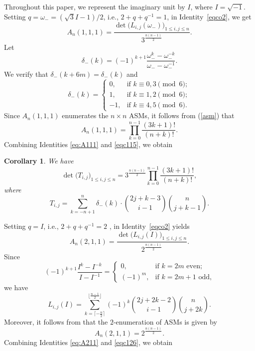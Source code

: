 \documentclass[12pt, a4paper]{amsart} %
\numberwithin{equation}{section}
\newtheorem{corollary}[theorem]{Corollary}
\begin{document}
\medskip

Throughout this paper, we represent the imaginary unit by $I$, where $I=\sqrt{-1}$.
Setting $q=\omega_{-}=({\sqrt{3}I - 1})/{2}$, i.e.,  $2+q+q^{-1}=1$, in 
Identity~\eqref{eqco2}, we get
\begin{equation}\label{eq:A111}
  A_{n}(1,1,1)
	= \frac{\det\bigl( L_{i,j}(\omega_{-}) \bigr)_{1 \le i,j \le n}}{3^{\frac{n(n-1)}{2}}}.
\end{equation}
Let
\begin{equation*}
	\delta_{-}(k) =  (-1)^{k+1}\frac{\omega_{-}^k- \omega_{-}^{-k}}{\omega_{-}- \omega_{-}^{-1}}. 
\end{equation*}
We verify that $\delta_{-}(k+6m) = \delta_{-}(k)$ and
$$
\delta_{-}(k) = 
\begin{cases}
0, & \text{if } k \equiv 0, 3 \pmod{6}; \\
1, & \text{if } k \equiv 1, 2 \pmod{6}; \\
-1, & \text{if } k \equiv 4, 5 \pmod{6}.
\end{cases}
$$
Since $A_n(1,1,1)$ enumerates the $n\times n$ ASMs, it follows from (\ref{asm}) that
\begin{equation}\label{eqc115}
    A_n(1,1,1)=\prod_{k=0}^{n-1}\frac{(3k+1)!}{(n+k)!}.
\end{equation}
Combining Identities \eqref{eq:A111}  and \eqref{eqc115}, we obtain 

\begin{corollary} We have
    \begin{equation}\label{eqc111}
        \det{\bigl(T_{i,j}\bigr)_{1 \le i,j \le n}}=3^{\frac{n(n-1)}{2}}\prod_{k=0}^{n-1}\frac{(3k+1)!}{(n+k)!},
    \end{equation}
 where
    $$
    T_{i,j}=\sum_{k=-n+1}^{n}\delta_{-}(k)\cdot\binom{2j+k-3}{i-1}\binom{n}{j+k-1}.$$
\end{corollary}

 

Setting $q=I$, i.e., $2+q+q^{-1}= 2$ ,  in Identity~\eqref{eqco2} yields 
\begin{equation}\label{eq:A211}
  A_{n}(2,1,1)
	= \frac{\det\bigl( L_{i,j}(I) \bigr)_{1 \le i,j \le n}}{2^{\frac{n(n-1)}{2}}}.
\end{equation}
Since
$$
(-1)^{k+1} \frac{I^{k}-I^{-k}}{I-I^{-1}}  =
\begin{cases}
	0,      & \text{if $k=2m$ even;} \\
	(-1)^m, & \text{if $k=2m+1$ odd,}
\end{cases}
$$
we have
$$
L_{i,j}(I)=\sum_{k=\lceil  -\frac{n}{2}\rceil }^{ \lfloor \frac{n-1}{2} \rfloor}(-1)^{k}\binom{2j+2k-2}{i-1}\binom{n}{j+2k}.
$$
Moreover, it follows from \cite{MRR2} that the $2$-enumeration of ASMs is given by 
\begin{equation}\label{eqc126}
    A_n(2,1,1)=2^{\frac{n(n-1)}{2}}.
\end{equation} 
Combining Identities \eqref{eq:A211}  and \eqref{eqc126}, we obtain 
\end{document}

